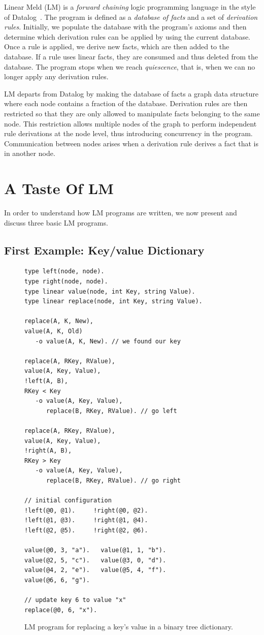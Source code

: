 
Linear Meld (LM) is a \emph{forward chaining} logic programming language in the
style of Datalog~\cite{Ullman:1990:PDK:533142}. The program is defined as a
\emph{database of facts} and a set of \emph{derivation rules}.  Initially, we
populate the database with the program's axioms and then determine which
derivation rules can be applied by using the current database. Once a rule is
applied, we derive new facts, which are then added to the database.  If a rule
uses linear facts, they are consumed and thus deleted from the database.  The
program stops when we reach \emph{quiescence}, that is, when we can no longer
apply any derivation rules.

LM departs from Datalog by making the database of facts a graph data structure
where each node contains a fraction of the database. Derivation rules are then
restricted so that they are only allowed to manipulate facts belonging to the
same node. This restriction allows multiple nodes of the graph to perform
independent rule derivations at the node level, thus introducing concurrency in
the program. Communication between nodes arises when a derivation rule derives a
fact that is in another node.

\section{A Taste Of LM}

In order to understand how LM programs are written, we now present and discuss
three basic LM programs.

\subsection{First Example: Key/value Dictionary}

\begin{figure}[ht]
\begin{Verbatim}[numbers=right,fontsize=\scriptsize]
type left(node, node).
type right(node, node).
type linear value(node, int Key, string Value).
type linear replace(node, int Key, string Value).

replace(A, K, New),
value(A, K, Old)
   -o value(A, K, New). // we found our key

replace(A, RKey, RValue),
value(A, Key, Value),
!left(A, B),
RKey < Key
   -o value(A, Key, Value),
      replace(B, RKey, RValue). // go left

replace(A, RKey, RValue),
value(A, Key, Value),
!right(A, B),
RKey > Key
   -o value(A, Key, Value),
      replace(B, RKey, RValue). // go right

// initial configuration
!left(@0, @1).     !right(@0, @2).
!left(@1, @3).     !right(@1, @4). 
!left(@2, @5).     !right(@2, @6).

value(@0, 3, "a").   value(@1, 1, "b").
value(@2, 5, "c").   value(@3, 0, "d").
value(@4, 2, "e").   value(@5, 4, "f").
value(@6, 6, "g").

// update key 6 to value "x"
replace(@0, 6, "x").
\end{Verbatim}
\caption{LM program for replacing a key's value in a binary tree dictionary.}
\label{code:btree_replace}
\end{figure}

